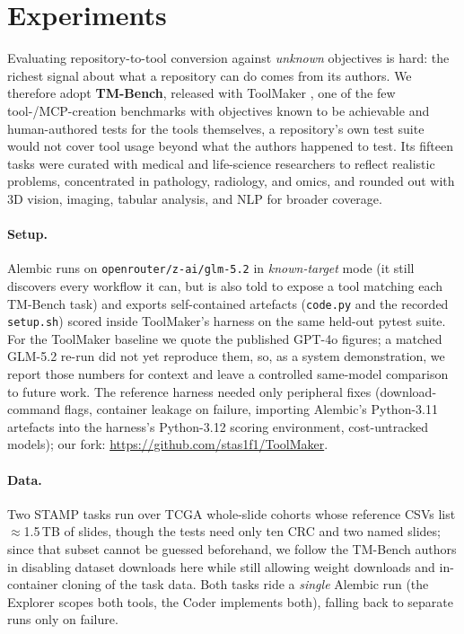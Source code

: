 \section{Experiments}
\label{sec:experiments}

Evaluating repository-to-tool conversion against \emph{unknown} objectives is
hard: the richest signal about what a repository can do comes from its authors.
We therefore adopt \textbf{TM-Bench}, released with ToolMaker
\citep{toolmaker2025}, one of the few tool-/MCP-creation benchmarks with
objectives known to be achievable and human-authored tests for the tools
themselves, a repository's own test suite would not cover tool usage beyond
what the authors happened to test. Its fifteen tasks were curated with medical
and life-science researchers to reflect realistic problems, concentrated in
pathology, radiology, and omics, and rounded out with 3D vision, imaging,
tabular analysis, and NLP for broader coverage.

\paragraph{Setup.} Alembic runs on \texttt{openrouter/z-ai/glm-5.2} in
\emph{known-target} mode (it still discovers every workflow it can, but is also
told to expose a tool matching each TM-Bench task) and exports self-contained
artefacts (\texttt{code.py} and the recorded \texttt{setup.sh}) scored inside
ToolMaker's harness on the same held-out pytest suite. For the ToolMaker
baseline we quote the published GPT-4o figures; a matched GLM-5.2 re-run did not
yet reproduce them, so, as a system demonstration, we report those numbers for
context and leave a controlled same-model comparison to future work. The
reference harness needed only peripheral fixes (download-command flags,
container leakage on failure, importing Alembic's Python-3.11 artefacts into the
harness's Python-3.12 scoring environment, cost-untracked models); our fork:
\url{https://github.com/stas1f1/ToolMaker}.

\paragraph{Data.} Two STAMP tasks run over TCGA whole-slide cohorts whose
reference CSVs list $\approx$1.5\,TB of slides, though the tests need only ten
CRC and two named slides; since that subset cannot be guessed beforehand, we
follow the TM-Bench authors in disabling dataset downloads here while still
allowing weight downloads and in-container cloning of the task data. Both tasks
ride a \emph{single} Alembic run (the Explorer scopes both tools, the Coder
implements both), falling back to separate runs only on failure.

